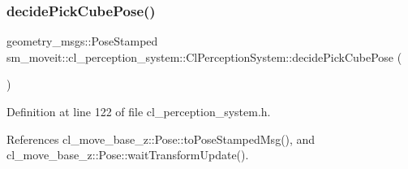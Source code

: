 \subsubsection{\texorpdfstring{decide\+Pick\+Cube\+Pose()}{decidePickCubePose()}}
{\footnotesize\ttfamily geometry\+\_\+msgs\+::\+Pose\+Stamped sm\+\_\+moveit\+::cl\+\_\+perception\+\_\+system\+::\+Cl\+Perception\+System\+::decide\+Pick\+Cube\+Pose (\begin{DoxyParamCaption}{ }\end{DoxyParamCaption})\hspace{0.3cm}{\ttfamily [inline]}}



Definition at line 122 of file cl\+\_\+perception\+\_\+system.\+h.



References cl\+\_\+move\+\_\+base\+\_\+z\+::\+Pose\+::to\+Pose\+Stamped\+Msg(), and cl\+\_\+move\+\_\+base\+\_\+z\+::\+Pose\+::wait\+Transform\+Update().


